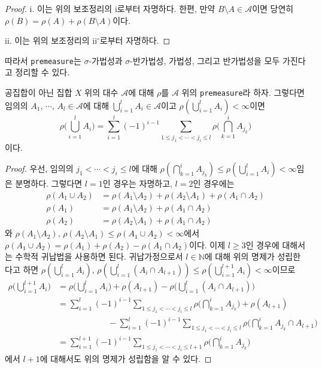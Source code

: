\begin{proof}
    i. 이는 위의 보조정리의 i로부터 자명하다. 한편, 만약 $B\setminus A\in\mathcal{A}$이면 당연히 $\rho(B)=\rho(A)+\rho(B\setminus A)$이다.

    ii. 이는 위의 보조정리의 ii$^\circ$로부터 자명하다.
\end{proof}

따라서 \texttt{premeasure}는 $\sigma$-가법성과 $\sigma$-반가법성, 가법성, 그리고 반가법성을 모두 가진다고 정리할 수 있다.

\begin{theorem}
    공집합이 아닌 집합 $X$ 위의 대수 $\mathcal{A}$에 대해 $\rho$를 $\mathcal{A}$ 위의 \texttt{premeasure}라 하자. 그렇다면 임의의 $A_1,\,\cdots,\,A_l\in\mathcal{A}$에 대해 $\bigcup_{i=1}^l A_i\in\mathcal{A}$이고 $\rho(\bigcup_{i=1}^l A_i)<\infty$이면
    \begin{equation*}
        \rho\bigg(\bigcup_{i=1}^lA_i\bigg)=\sum_{i=1}^l(-1)^{i-1}\sum_{1\leq j_1<\cdots<j_i\leq l}\rho\bigg(\bigcap_{k=1}^i A_{j_k}\bigg)
    \end{equation*}
    이다.
\end{theorem}

\begin{proof}
    우선, 임의의 $j_1<\cdots<j_i\leq l$에 대해 $\rho(\bigcap_{k=1}^i A_{j_k})\leq\rho(\bigcup_{i=1}^l A_i)<\infty$임은 분명하다. 그렇다면 $l=1$인 경우는 자명하고, $l=2$인 경우에는
    \begin{align*}
        \rho(A_1\cup A_2)&=\rho(A_1\setminus A_2)+\rho(A_2\setminus A_1)+\rho(A_1\cap A_2)\\
        \rho(A_1)&=\rho(A_1\setminus A_2)+\rho(A_1\cap A_2)\\
        \rho(A_2)&=\rho(A_2\setminus A_1)+\rho(A_1\cap A_2)
    \end{align*}
    와 $\rho(A_1\setminus A_2),\,\rho(A_2\setminus A_1)\leq\rho(A_1\cup A_2)<\infty$에서 $\rho(A_1\cup A_2)=\rho(A_1)+\rho(A_2)-\rho(A_1\cap A_2)$이다. 이제 $l\geq3$인 경우에 대해서는 수학적 귀납법을 사용하면 된다. 귀납가정으로서 $l\in\mathbb{N}$에 대해 위의 명제가 성립한다고 하면 $\rho(\bigcup_{i=1}^lA_i),\,\rho(\bigcup_{i=1}^l(A_i\cap A_{l+1}))\leq\rho(\bigcup_{i=1}^{l+1}A_i)<\infty$이므로
    \begin{align*}
    \rho\bigg(\bigcup_{i=1}^{l+1}A_i\bigg)&=\rho\bigg(\bigcup_{i=1}^lA_i\bigg)+\rho(A_{l+1})-\rho\bigg(\bigcup_{i=1}^l(A_i\cap A_{l+1})\bigg)\\
    &=\sum_{i=1}^l(-1)^{i-1}\sum_{1\leq j_1<\cdots<j_i\leq l}\rho\bigg(\bigcap_{k=1}^i A_{j_k}\bigg)+\rho(A_{l+1})\\
    &\qquad\qquad\qquad-\sum_{i=1}^l(-1)^{i-1}\sum_{1\leq j_1<\cdots<j_i\leq l}\rho\bigg(\bigcap_{k=1}^i A_{j_k}\cap A_{l+1}\bigg)\\
    &=\sum_{i=1}^{l+1}(-1)^{i-1}\sum_{1\leq j_1<\cdots<j_i\leq l+1}\rho\bigg(\bigcap_{k=1}^i A_{j_k}\bigg)
    \end{align*}
    에서 $l+1$에 대해서도 위의 명제가 성립함을 알 수 있다.
\end{proof}

